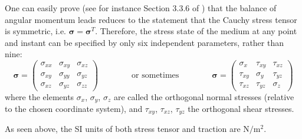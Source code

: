 One can easily prove (see for instance Section 3.3.6 of \cite{grbl09}) that the balance 
of angular momentum leads reduces to the statement that the Cauchy stress tensor 
is symmetric, i.e. ${\bm \sigma}={\bm \sigma}^T$.
Therefore, the stress state of the medium at any point and instant can be specified by only six independent parameters, rather than nine:
\begin{equation}
{\bm \sigma}=
\left(
\begin{array}{ccc}
\sigma_{xx} & \sigma_{xy} & \sigma_{xz} \\
\sigma_{xy} & \sigma_{yy} & \sigma_{yz} \\
\sigma_{xz} & \sigma_{yz} & \sigma_{zz} 
\end{array}
\right)
\qquad\qquad
\text{or sometimes}
\qquad\qquad
{\bm \sigma}=
\left(
\begin{array}{ccc}
\sigma_{x}  & \tau_{xy}  & \tau_{xz} \\
\tau_{xy}   & \sigma_{y} & \tau_{yz} \\
\tau_{xz}   & \tau_{yz}  & \sigma_{z} 
\end{array}
\right)
\end{equation}
where the elements $\sigma _{x}$, $\sigma _{y}$, $\sigma _{z}$ are called the orthogonal 
normal stresses (relative to the chosen coordinate system), and $\tau _{xy}$, $\tau _{xz}$,
$\tau _{yz}$ the orthogonal shear stresses.

As seen above, the SI units of both stress tensor and traction are $\text{N}/\text{m}^2$.


 





%
